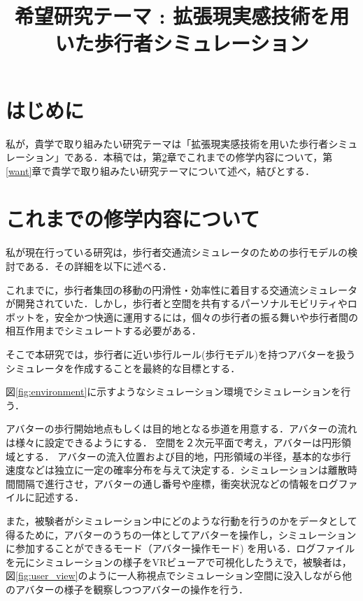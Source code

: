 \documentclass[twocolumn]{jarticle}%
\title{\vspace{5mm}\large{希望研究テーマ : 拡張現実感技術を用いた歩行者シミュレーション}\vspace{-15mm}}
\date{}
\begin{document}
\normalsize
\maketitle

\section{はじめに}
\thispagestyle{fancy}

私が，貴学で取り組みたい研究テーマは「拡張現実感技術を用いた歩行者シミュレーション」である．本稿では，第\ref{current}章でこれまでの修学内容について，第\ref{want}章で貴学で取り組みたい研究テーマについて述べ，結びとする．

\vspace{-2mm}
\section{これまでの修学内容について}\label{current}
\thispagestyle{fancy}
私が現在行っている研究は，歩行者交通流シミュレータのための歩行モデルの検討である．その詳細を以下に述べる．

これまでに，歩行者集団の移動の円滑性・効率性に着目する交通流シミュレータが開発されていた．しかし，歩行者と空間を共有するパーソナルモビリティやロボットを，安全かつ快適に運用するには，個々の歩行者の振る舞いや歩行者間の相互作用までシミュレートする必要がある．

そこで本研究では，歩行者に近い歩行ルール(歩行モデル)を持つアバターを扱うシミュレータを作成することを最終的な目標とする．


図\ref{fig:environment}に示すようなシミュレーション環境でシミュレーションを行う．

アバターの歩行開始地点もしくは目的地となる歩道を用意する．アバターの流れは様々に設定できるようにする．
空間を２次元平面で考え，アバターは円形領域とする． アバターの流入位置および目的地，円形領域の半径，基本的な歩行速度などは独立に一定の確率分布を与えて決定する．シミュレーションは離散時間間隔で進行させ，アバターの通し番号や座標，衝突状況などの情報をログファイルに記述する． 

また，被験者がシミュレーション中にどのような行動を行うのかをデータとして得るために，アバターのうちの一体としてアバターを操作し，シミュレーションに参加することができるモード（アバター操作モード) を用いる．ログファイルを元にシミュレーションの様子をVRビューアで可視化したうえで，被験者は，図\ref{fig:user_view}のように一人称視点でシミュレーション空間に没入しながら他のアバターの様子を観察しつつアバターの操作を行う．
\end{document}
